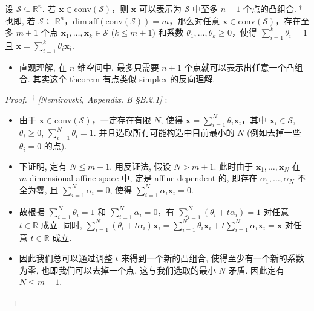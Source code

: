 \begin{thmblock}[{Carathéodory}]
设 $\mathcal{S} \subseteq \mathbb{R}^n$. 若 $\bm{x} \in \text{conv}(\mathcal{S})$，则 $\bm{x}$ 可以表示为 $\mathcal{S}$ 中至多 $n+1$ 个点的凸组合. $^\dagger$ 也即, 若 $\mathcal{S} \subseteq \mathbb{R}^n$，$\text{dim}~\text{aff}(\text{conv}(\mathcal{S})) = m$，那么对任意 $\bm{x} \in \text{conv}(\mathcal{S})$，存在至多 $m+1$ 个点 $\bm{x}_1, \ldots, \bm{x}_{k} \in \mathcal{S}$ ($k \leq m+1$) 和系数 $\theta_1, \ldots, \theta_k \geq 0$，使得 $\sum_{i=1}^k \theta_i = 1$ 且 $\bm{x} = \sum_{i=1}^k \theta_i \bm{x}_i$.

\begin{itemize}
\item {}直观理解, 在 $n$ 维空间中, 最多只需要 $n+1$ 个点就可以表示出任意一个凸组合. 其实这个 theorem 有点类似 simplex 的反向理解.


\end{itemize}


\begin{proof}{}
$~^\dagger$ \emph{[Nemirovski, Appendix. B §B.2.1]} :

\begin{itemize}
\item {}由于 $\bm{x} \in \text{conv}(\mathcal{S})$，一定存在有限 $N$, 使得 $\bm{x} = \sum_{i=1}^N \theta_i \bm{x}_i$，其中 $\bm{x}_i \in \mathcal{S}$, $\theta_i \geq 0$, $\sum_{i=1}^N \theta_i = 1$. 并且选取所有可能构造中目前最小的 $N$ (例如去掉一些 $\theta_i = 0$ 的点).


\item {}下证明, 定有 $N \leq m+1$. 用反证法, 假设 $N > m+1$. 此时由于 $\bm{x}_1, \ldots, \bm{x}_N$ 在 $m$-dimensional affine space 中, 定是 affine dependent 的, 即存在 $\alpha_1, \ldots, \alpha_N$ 不全为零, 且 $\sum_{i=1}^N \alpha_i = 0$, 使得 $\sum_{i=1}^N \alpha_i \bm{x}_i = 0$.


\item {}故根据 $\sum_{i=1}^N \theta_i = 1$ 和 $\sum_{i=1}^N \alpha_i = 0$，有 $\sum_{i=1}^N (\theta_i + t\alpha_i) = 1$ 对任意 $t \in \mathbb{R}$ 成立. 同时, $\sum_{i=1}^N (\theta_i + t\alpha_i) \bm{x}_i = \sum_{i=1}^N \theta_i \bm{x}_i + t\sum_{i=1}^N \alpha_i \bm{x}_i = \bm{x}$ 对任意 $t \in \mathbb{R}$ 成立.


\item {}因此我们总可以通过调整 $t$ 来得到一个新的凸组合, 使得至少有一个新的系数为零, 也即我们可以去掉一个点, 这与我们选取的最小 $N$ 矛盾. 因此定有 $N \leq m+1$.


\end{itemize}

\end{proof}

\end{thmblock}

